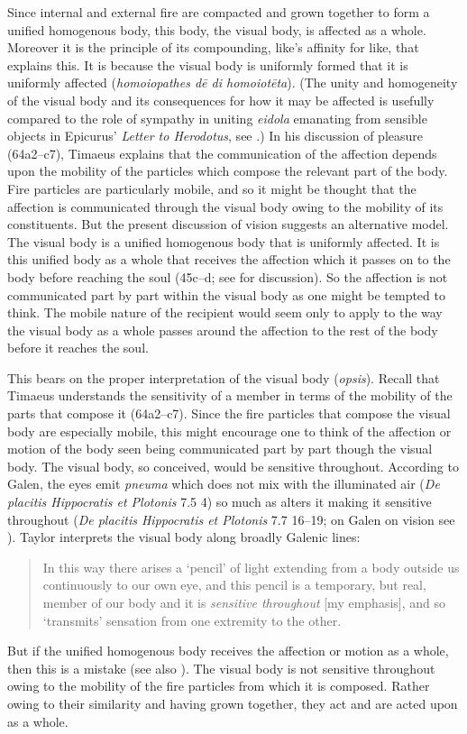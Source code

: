 Since internal and external fire are compacted and grown together to form a unified homogenous body, this body, the visual body, is affected as a whole. Moreover it is the principle of its compounding, like's affinity for like, that explains this. It is because the visual body is uniformly formed that it is uniformly affected (\emph{homoiopathes dē di homoiotēta}). (The unity and homogeneity of the visual body and its consequences for how it may be affected is usefully compared to the role of sympathy in uniting \emph{eidola} emanating from sensible objects in Epicurus' \emph{Letter to Herodotus}, see \citealt{Lee:1978yz}.) In his discussion of pleasure (64a2--c7), Timaeus explains that the communication of the affection depends upon the mobility of the particles which compose the relevant part of the body. Fire particles are particularly mobile, and so it might be thought that the affection is communicated through the visual body owing to the mobility of its constituents. But the present discussion of vision suggests an alternative model. The visual body is a unified homogenous body that is uniformly affected. It is this unified body as a whole that receives the affection which it passes on to the body before reaching the soul (45c--d; see \citealt[72, 92 n46]{Hahm:1978ny} for discussion). So the affection is not communicated part by part within the visual body as one might be tempted to think. The mobile nature of the recipient would seem only to apply to the way the visual body as a whole passes around the affection to the rest of the body before it reaches the soul.

This bears on the proper interpretation of the visual body (\emph{opsis}). Recall that Timaeus understands the sensitivity of a member in terms of the mobility of the parts that compose it (64a2–c7). Since the fire particles that compose the visual body are especially mobile, this might encourage one to think of the affection or motion of the body seen being communicated part by part though the visual body. The visual body, so conceived, would be sensitive throughout. According to Galen, the eyes emit \emph{pneuma} which does not mix with the illuminated air (\emph{De placitis Hippocratis et Plotonis} 7.5 4) so much as alters it making it sensitive throughout (\emph{De placitis Hippocratis et Plotonis} 7.7 16--19; on Galen on vision see \citealt{Ierodiakonou:2014rj}). Taylor interprets the visual body along broadly Galenic lines:
\begin{quote}
	In this way there arises a `pencil' of light extending from a body outside us continuously to our own eye, and this pencil is a temporary, but real, member of our body and it is \emph{sensitive throughout} [my emphasis], and so `transmits' sensation from one extremity to the other. \citep[278]{Taylor:1928qb}
\end{quote}
But if the unified homogenous body receives the affection or motion as a whole, then this is a mistake (see also \citealt[153 n1]{Cornford:1935fk}). The visual body is not sensitive throughout owing to the mobility of the fire particles from which it is composed. Rather owing to their similarity and having grown together, they act and are acted upon as a whole.

